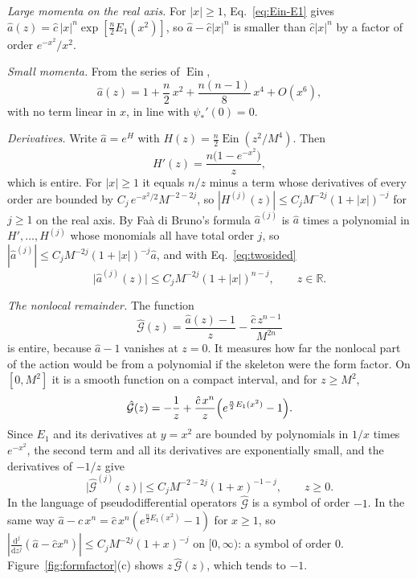 \documentclass[a4paper,11pt]{article}
\newcommand{\bR}{\mathbb{R}}
\newcommand{\dd}{\mathrm{d}}
\newcommand{\Ein}{\operatorname{Ein}}
\begin{document}
\textit{Large momenta on the real axis.} For $|x|\ge1$, Eq.~\eqref{eq:Ein-E1} gives $\hat a(z)=\hat c\,|x|^{n}\exp[\frac n2E_1(x^2)]$, so $\hat a-\hat c|x|^n$ is smaller than $\hat c|x|^n$ by a factor of order $e^{-x^2}/x^2$.

\textit{Small momenta.} From the series of $\Ein$,
\begin{equation}
\label{eq:IR}
\hat a(z)=1+\frac n2\,x^2+\frac{n(n-1)}8\,x^4+O(x^6),
\end{equation}
with no term linear in $x$, in line with $\psi_*'(0)=0$.

\textit{Derivatives.} Write $\hat a=e^{H}$ with $H(z)=\frac n2\Ein(z^2/M^4)$. Then
\[
H'(z)=\frac{n\bigl(1-e^{-x^2}\bigr)}{z},
\]
which is entire. For $|x|\ge1$ it equals $n/z$ minus a term whose derivatives of every order are bounded by $C_j\,e^{-x^2/2}M^{-2-2j}$, so $|H^{(j)}(z)|\le C_jM^{-2j}(1+|x|)^{-j}$ for $j\ge1$ on the real axis. By Fa\`a di Bruno's formula $\hat a^{(j)}$ is $\hat a$ times a polynomial in $H',\dots,H^{(j)}$ whose monomials all have total order $j$, so $|\hat a^{(j)}|\le C_jM^{-2j}(1+|x|)^{-j}\hat a$, and with Eq.~\eqref{eq:twosided}
\begin{equation}
\label{eq:aderiv}
\bigl|\hat a^{(j)}(z)\bigr|\le C_jM^{-2j}(1+|x|)^{n-j},\qquad z\in\bR .
\end{equation}

\textit{The nonlocal remainder.} The function
\begin{equation}
\label{eq:Ghat}
\hat{\mathcal G}(z)=\frac{\hat a(z)-1}{z}-\frac{\hat c\,z^{n-1}}{M^{2n}}
\end{equation}
is entire, because $\hat a-1$ vanishes at $z=0$. It measures how far the nonlocal part of the action would be from a polynomial if the skeleton were the form factor. On $[0,M^2]$ it is a smooth function on a compact interval, and for $z\ge M^2$,
\[
\hat{\mathcal G}(z)=-\frac1z+\frac{\hat c\,x^n}{z}\Bigl(e^{\frac n2E_1(x^2)}-1\Bigr).
\]
Since $E_1$ and its derivatives at $y=x^2$ are bounded by polynomials in $1/x$ times $e^{-x^2}$, the second term and all its derivatives are exponentially small, and the derivatives of $-1/z$ give
\begin{equation}
\label{eq:Ghatsymbol}
\bigl|\hat{\mathcal G}^{(j)}(z)\bigr|\le C_jM^{-2-2j}(1+x)^{-1-j},\qquad z\ge0 .
\end{equation}
In the language of pseudodifferential operators $\hat{\mathcal G}$ is a symbol of order $-1$. In the same way $\hat a-\hat c\,x^n=\hat c\,x^n(e^{\frac n2E_1(x^2)}-1)$ for $x\ge1$, so $|\frac{\dd^j}{\dd z^j}(\hat a-\hat cx^n)|\le C_jM^{-2j}(1+x)^{-j}$ on $[0,\infty)$: a symbol of order $0$. Figure~\ref{fig:formfactor}(c) shows $z\,\hat{\mathcal G}(z)$, which tends to $-1$.
\end{document}
